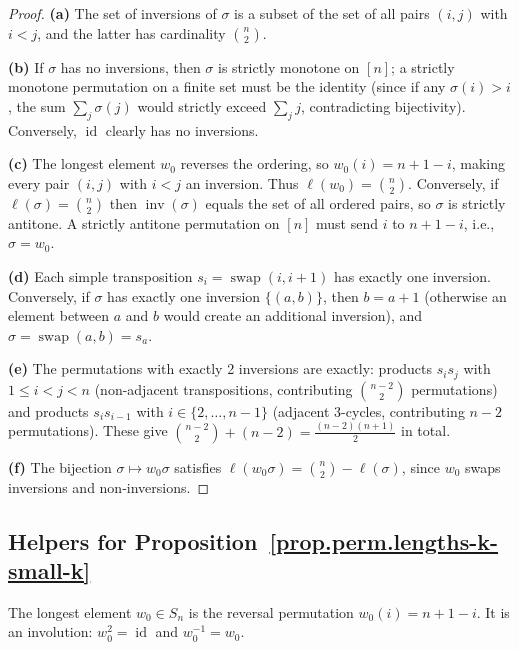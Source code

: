 \begin{proof}
\leanok

\textbf{(a)}
The set of inversions of $\sigma$ is a subset of the set of all pairs $(i,j)$ with $i < j$, and the latter has cardinality $\binom{n}{2}$.

\textbf{(b)}
If $\sigma$ has no inversions, then $\sigma$ is strictly monotone on $[n]$; a strictly monotone permutation on a finite set must be the identity (since if any $\sigma(i) > i$, the sum $\sum_j \sigma(j)$ would strictly exceed $\sum_j j$, contradicting bijectivity).
Conversely, $\operatorname{id}$ clearly has no inversions.

\textbf{(c)}
The longest element $w_0$ reverses the ordering, so $w_0(i) = n+1-i$,
making every pair $(i,j)$ with $i<j$ an inversion. Thus $\ell(w_0) = \binom{n}{2}$.
Conversely, if $\ell(\sigma) = \binom{n}{2}$ then $\operatorname{inv}(\sigma)$ equals the set of all ordered pairs,
so $\sigma$ is strictly antitone.
A strictly antitone permutation on $[n]$ must send $i$ to $n+1-i$, i.e., $\sigma = w_0$.

\textbf{(d)}
Each simple transposition $s_i = \operatorname{swap}(i, i+1)$ has exactly one inversion.
Conversely, if $\sigma$ has exactly one inversion $\{(a,b)\}$, then $b = a + 1$
(otherwise an element between $a$ and $b$ would create an additional inversion),
and $\sigma = \operatorname{swap}(a, b) = s_a$.

\textbf{(e)}
The permutations with exactly 2 inversions are exactly:
products $s_i s_j$ with $1 \le i < j < n$ (non-adjacent transpositions, contributing $\binom{n-2}{2}$ permutations)
and products $s_i s_{i-1}$ with $i \in \{2, \ldots, n-1\}$ (adjacent 3-cycles, contributing $n-2$ permutations).
These give $\binom{n-2}{2} + (n-2) = \frac{(n-2)(n+1)}{2}$ in total.

\textbf{(f)}
The bijection $\sigma \mapsto w_0 \sigma$ satisfies $\ell(w_0\sigma) = \binom{n}{2} - \ell(\sigma)$,
since $w_0$ swaps inversions and non-inversions.
\end{proof}

\subsection{Helpers for Proposition~\ref{prop.perm.lengths-k-small-k}}

\begin{lemma}
\label{lem.perm.longestElement}
\leanhelper
\leanok
The longest element $w_0 \in S_n$ is the reversal permutation $w_0(i) = n+1-i$.
It is an involution: $w_0^2 = \operatorname{id}$ and $w_0^{-1} = w_0$.
\end{lemma}

